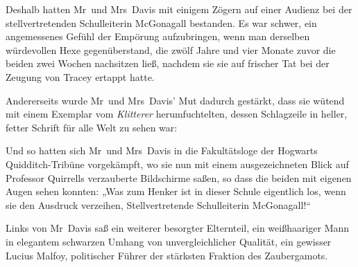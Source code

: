 Deshalb hatten Mr~und Mrs~Davis mit einigem Zögern auf einer Audienz bei der stellvertretenden Schulleiterin McGonagall bestanden. Es war schwer, ein angemessenes Gefühl der Empörung aufzubringen, wenn man derselben würdevollen Hexe gegenüberstand, die zwölf Jahre und vier Monate zuvor die beiden zwei Wochen nachsitzen ließ, nachdem sie sie auf frischer Tat bei der Zeugung von Tracey ertappt hatte.

Andererseits wurde Mr~und Mrs~Davis’ Mut dadurch gestärkt, dass sie wütend mit einem Exemplar vom \emph{Klitterer} herumfuchtelten, dessen Schlagzeile in heller, fetter Schrift für alle Welt zu sehen war:


Und so hatten sich Mr~und Mrs~Davis in die Fakultätsloge der Hogwarts Quidditch-Tribüne vorgekämpft, wo sie nun mit einem ausgezeichneten Blick auf Professor Quirrells verzauberte Bildschirme saßen, so dass die beiden mit eigenen Augen sehen konnten:
„Was zum Henker ist in dieser Schule eigentlich los, wenn sie den Ausdruck verzeihen, Stellvertretende Schulleiterin McGonagall!“

Links von Mr~Davis saß ein weiterer besorgter Elternteil, ein weißhaariger Mann in elegantem schwarzen Umhang von unvergleichlicher Qualität, ein gewisser Lucius Malfoy, politischer Führer der stärksten Fraktion des Zaubergamots.

